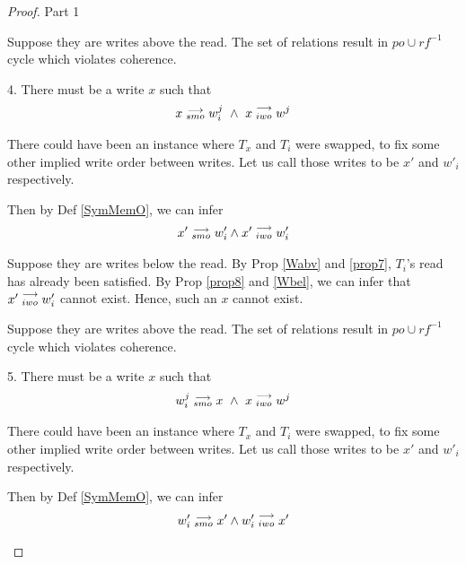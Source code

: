 \begin{proof}{Part 1}
\begin{itemize}
                        Suppose they are writes above the read.
                        The set of relations result in $po \cup rf^{-1}$ cycle which violates coherence.  

                        4. There must be a write $x$ such that 
                        \begin{align*}
                            \reln{x}{smo}{w_i^j} \ \wedge \ \reln{x}{iwo}{w^j}
                        \end{align*}

                        There could have been an instance where $T_x$ and $T_i$ were swapped, to fix some other implied write order between writes. 
                        Let us call those writes to be $x'$ and $w'_i$ respectively.
                        
                        Then by Def \ref{SymMemO}, we can infer 
                        \begin{align*}
                            x'\stackrel{\longrightarrow}{_{smo}}w'_i \wedge x'\stackrel{\longrightarrow}{_{iwo}}w'_i
                        \end{align*}

                        Suppose they are writes below the read. 
                        By Prop \ref{Wabv} and \ref{prop7}, $T_i$'s read has already been satisfied. By Prop \ref{prop8} and \ref{Wbel}, we can infer that $x'\stackrel{\longrightarrow}{_{iwo}}w'_i$ cannot exist. Hence, such an $x$ cannot exist.
                        
                        Suppose they are writes above the read.
                        The set of relations result in $po \cup rf^{-1}$ cycle which violates coherence.  

                        5. There must be a write $x$ such that 
                        \begin{align*}
                            \reln{w_i^j}{smo}{x} \ \wedge \ \reln{x}{iwo}{w^j}
                        \end{align*}
                        
                        There could have been an instance where $T_x$ and $T_i$ were swapped, to fix some other implied write order between writes. 
                        Let us call those writes to be $x'$ and $w'_i$ respectively.
                        
                        Then by Def \ref{SymMemO}, we can infer 
                        \begin{align*}
                            w'_i\stackrel{\longrightarrow}{_{smo}}x' \wedge w'_i\stackrel{\longrightarrow}{_{iwo}}x'
                        \end{align*}


\end{itemize}
\end{proof}
